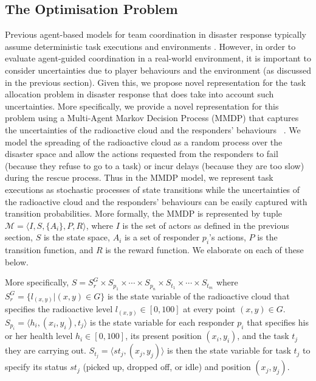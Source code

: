 \subsection{The Optimisation Problem}
\label{sec:model}
\noindent Previous agent-based models for team coordination in disaster response typically assume deterministic task executions and environments \cite{ramchurn:etal:2010,Scerri2005}. However, in order to evaluate agent-guided coordination in a real-world environment, it is important to consider uncertainties due to player behaviours and the environment (as discussed in the previous section). Given this, we propose novel representation for the task allocation problem in disaster response that does take into account such uncertainties. More specifically, we provide a novel representation for this problem using a Multi-Agent Markov Decision Process (MMDP) that captures the uncertainties of the radioactive cloud and the responders' behaviours ~\cite{boutilier1996planning}. We model the spreading of the radioactive cloud as a random process over the disaster space and allow the actions requested from the responders to  fail (because they refuse to go to a  task) or incur delays (because they are too slow) during the rescue process. Thus in the MMDP model, we represent  task executions as stochastic processes of state transitions while the uncertainties of the radioactive cloud and the responders' behaviours can be easily captured with transition probabilities.  More formally, the MMDP is
represented by tuple $\mathcal{M} = \langle I, S, \{A_i\}, P, R
\rangle$, where $I$ is the set of actors as defined in the previous
section,  $S$ is the state space, $A_i$ is a set of responder
$p_i$'s actions, $P$ is the transition function, and $R$ is the
reward function. We elaborate on each of these below.

More specifically, $S= S^G_r \times S_{p_1} \times \cdots \times
S_{p_n} \times S_{t_1} \times \cdots \times S_{t_m}$ where $S^G_r =
\{l_{(x,y)}| (x, y) \in G\}$ is the state variable of the
radioactive cloud that specifies the radioactive level
$l_{(x,y)}\in[0, 100]$ at every point $(x, y)\in G$. $S_{p_i} =
\langle h_i, (x_i, y_i), t_j \rangle$ is the state variable for
each responder $p_i$ that specifies his or her health level
$h_i\in[0, 100]$, its present position $(x_i, y_i)$, and the task
$t_j$ they are carrying out. $S_{t_j} = \langle st_j, (x_j, y_j)
\rangle$ is then the state variable for task $t_j$ to specify its
status $st_j$ (picked up, dropped off, or idle) and position $(x_j,
y_j)$.

